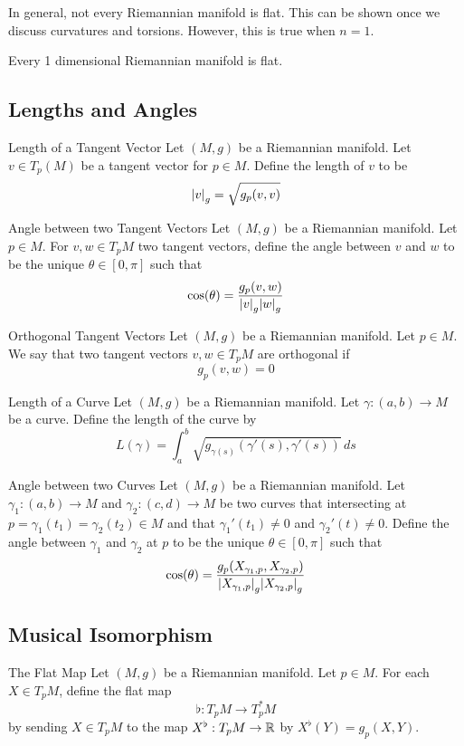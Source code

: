 \documentclass[a4paper]{article}
\begin{document}
In general, not every Riemannian manifold is flat. This can be shown once we discuss curvatures and torsions. However, this is true when $n=1$. 

\begin{lmm}{}{} Every 1 dimensional Riemannian manifold is flat. 
\end{lmm}

\subsection{Lengths and Angles}
\begin{defn}{Length of a Tangent Vector}{} Let $(M,g)$ be a Riemannian manifold. Let $v\in T_p(M)$ be a tangent vector for $p\in M$. Define the length of $v$ to be $$\abs{v}_g=\sqrt{g_p(v,v)}$$
\end{defn}

\begin{defn}{Angle between two Tangent Vectors}{} Let $(M,g)$ be a Riemannian manifold. Let $p\in M$. For $v,w\in T_pM$ two tangent vectors, define the angle between $v$ and $w$ to be the unique $\theta\in[0,\pi]$ such that $$\cos(\theta)=\frac{g_p(v,w)}{\abs{v}_g\abs{w}_g}$$
\end{defn}

\begin{defn}{Orthogonal Tangent Vectors}{} Let $(M,g)$ be a Riemannian manifold. Let $p\in M$. We say that two tangent vectors $v,w\in T_pM$ are orthogonal if $$g_p(v,w)=0$$
\end{defn}

\begin{defn}{Length of a Curve}{} Let $(M,g)$ be a Riemannian manifold. Let $\gamma:(a,b)\to M$ be a curve. Define the length of the curve by $$L(\gamma)=\int_a^b\sqrt{g_{\gamma(s)}(\gamma'(s),\gamma'(s))}\,ds$$
\end{defn}

\begin{defn}{Angle between two Curves}{} Let $(M,g)$ be a Riemannian manifold. Let $\gamma_1:(a,b)\to M$ and $\gamma_2:(c,d)\to M$ be two curves that intersecting at $p=\gamma_1(t_1)=\gamma_2(t_2)\in M$ and that $\gamma_1'(t_1)\neq 0$ and $\gamma_2'(t)\neq 0$. Define the angle between $\gamma_1$ and $\gamma_2$ at $p$ to be the unique $\theta\in[0,\pi]$ such that $$\cos(\theta)=\frac{g_p(X_{\gamma_1,p},X_{\gamma_2,p})}{\abs{X_{\gamma_1,p}}_g\abs{X_{\gamma_2,p}}_g}$$
\end{defn}

\subsection{Musical Isomorphism}
\begin{defn}{The Flat Map}{} Let $(M,g)$ be a Riemannian manifold. Let $p\in M$. For each $X\in T_pM$, define the flat map $$\flat:T_pM\to T_p^\ast M$$ by sending $X\in T_pM$ to the map $X^\flat:T_pM\to\mathbb{R}$ by $X^\flat(Y)=g_p(X,Y)$. 
\end{defn}
\end{document}
